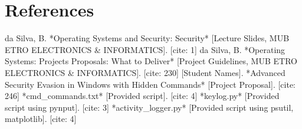 \documentclass[11pt]{article}
\begin{document}
	\section*{References} %
	\begin{thebibliography}{99} %
		
		 da Silva, B. *Operating Systems and Security: Security* [Lecture Slides, MUB ETRO ELECTRONICS & INFORMATICS]. [cite: 1]
		 da Silva, B. *Operating Systems: Projects Proposals: What to Deliver* [Project Guidelines, MUB ETRO ELECTRONICS & INFORMATICS]. [cite: 230]
		 [Student Names]. *Advanced Security Evasion in Windows with Hidden Commands* [Project Proposal]. [cite: 246]
		 *cmd_commands.txt* [Provided script]. [cite: 4]
		 *keylog.py* [Provided script using pynput]. [cite: 3]
		 *activity_logger.py* [Provided script using psutil, matplotlib]. [cite: 4] %
		

\end{thebibliography}
\end{document}
